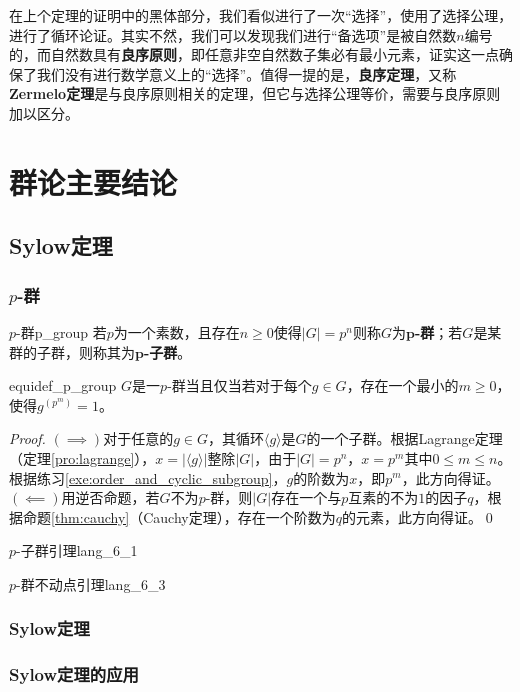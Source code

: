 \documentclass[../main.tex]{subfiles}
\begin{document}
\begin{remark}
在上个定理的证明中的黑体部分，我们看似进行了一次“选择”，使用了选择公理，进行了循环论证。其实不然，我们可以发现我们进行“备选项”是被自然数$n$编号的，而自然数具有\textbf{良序原则}，即任意非空自然数子集必有最小元素，证实这一点确保了我们没有进行数学意义上的“选择”。值得一提的是，\textbf{良序定理}，又称\textbf{Zermelo定理}是与良序原则相关的定理，但它与选择公理等价，需要与良序原则加以区分。
\end{remark}
\section{群论主要结论}
\subsection{Sylow定理}
\subsubsection{$p$-群}
\begin{definition}{$p$-群}{p_group}
若$p$为一个素数，且存在$n\geq0$使得$|G|=p^n$则称$G$为\textbf{$\mathbf{p}$-群}；若$G$是某群的子群，则称其为\textbf{$\mathbf{p}$-子群}。
\end{definition}
\begin{proposition}{}{equidef_p_group}
$G$是一$p$-群当且仅当若对于每个$g\in G$，存在一个最小的$m\geq0$，使得$g^{(p^m)}=1$。
\end{proposition}
\begin{proof}
$(\implies)$对于任意的$g\in G$，其循环$\langle g\rangle$是$G$的一个子群。根据Lagrange定理（定理\ref{pro:lagrange}），$x=|\langle g\rangle|$整除$|G|$，由于$|G|=p^n$，$x=p^m$其中$0\leq m\leq n$。根据练习\ref{exe:order_and_cyclic_subgroup}，$g$的阶数为$x$，即$p^m$，此方向得证。$(\impliedby)$用逆否命题，若$G$不为$p$-群，则$|G|$存在一个与$p$互素的不为$1$的因子$q$，根据命题\ref{thm:cauchy}（Cauchy定理），存在一个阶数为$q$的元素，此方向得证。\qed
\end{proof}
\begin{lemma}{$p$-子群引理}{lang_6_1}
\end{lemma}
\begin{lemma}{$p$-群不动点引理}{lang_6_3}
\end{lemma}
\subsubsection{Sylow定理}
\subsubsection{Sylow定理的应用}\label{subsub:sylow_theorems_applications}
\end{document}
